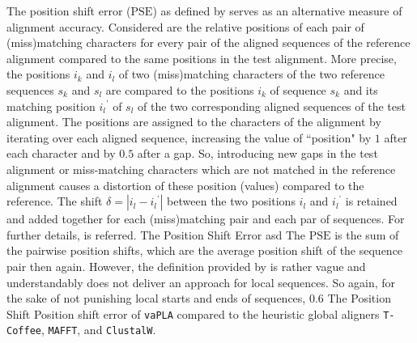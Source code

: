 \documentclass[a4paper,10pt]{thesis}
\newcommand{\software}{\texttt{vaPLA}}
\newcommand{\dotted}{^{\texttt{'}}}
\begin{document}
{{    \gapBig
     The position shift error ($\mbox{PSE}$) as defined by \citet{oxbench} serves as an alternative measure of alignment accuracy. Considered are the relative positions of each pair of (miss)matching characters for every pair of the aligned sequences of the reference alignment compared to the same positions in the test alignment. More precise, the positions $i_k$ and $i_l$ of two (miss)matching characters of the two reference sequences $s_k$ and $s_l$ are compared to the positions $i_k$ of sequence $s_k$ and its matching position ${i_l}\dotted$ of $s_l$ of the two corresponding aligned sequences of the test alignment. The positions are assigned to the characters of the alignment by iterating over each aligned sequence, increasing the value of ``position" by $1$ after each character and by $0.5$ after a gap. So, introducing new gaps in the test alignment or miss-matching characters which are not matched in the reference alignment causes a distortion of these position (values) compared to the reference. The shift $\delta=|i_l-{i_l}\dotted|$ between the two positions $i_l$ and ${i_l}\dotted$ is retained and added together for each (miss)matching pair and each par of sequences. For further details, \cite{oxbench} is referred. 
    \newFormula{
      \mbox{PSE} ~~ = ~~ \sum_{k=1}^{N-1} ~ \sum_{l=k+1}^{N} ~ \frac{
        \sum_{i=1}^{m_{s_ks_l}} ~~ |i_l - {i_l}\dotted|
      }{
        m_{s_ks_l}
      }
    }
    {The Position Shift Error}
    {asd}%
    The $\mbox{PSE}$ is the sum of the pairwise position shifts, which are the average position shift of the sequence pair then again. However, the definition provided by \citet{oxbench} is rather vague and understandably does not deliver an approach for local sequences. So again, for the sake of not punishing local starts and ends of sequences, 
    {0.6\textwidth}
    {The Position Shift}
    {Position shift error of \software{} compared to the heuristic global aligners \texttt{T-Coffee}, \texttt{MAFFT}, and \texttt{ClustalW}.}%
    \newpage
  }
}
\makeStatutoryDeclaration
\end{document}
